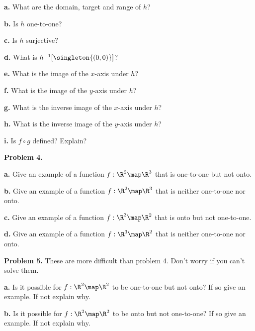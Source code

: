 \documentclass[oneside,12pt]{amsart}
\begin{document}
\smallskip

\textbf{a.}  What are the domain, target and range of $h$?

\medskip

\textbf{b.} Is $h$ one-to-one?

\medskip

\textbf{c.} Is $h$ surjective?

\medskip

\textbf{d.} What is $h^{-1}[\singleton{(0,0)}]$?

\medskip

\textbf{e.} What is the image of the $x$-axis under $h$?

\medskip

\textbf{f.} What is the image of the $y$-axis under $h$?

\medskip

\textbf{g.} What is the inverse image of the $x$-axis under $h$?

\medskip

\textbf{h.} What is the inverse image of the $y$-axis under $h$?

\medskip

\textbf{i.} Is $f \circ g$ defined? Explain?

\bigskip

\textbf{Problem 4.}
\smallskip

\textbf{a.} Give an example of a function $f:\R^2\map\R^3$ that is
one-to-one but not onto.

\bigskip

\textbf{b.} Give an example of a function $f:\R^2\map\R^3$ that is neither
one-to-one nor onto.

\bigskip

\textbf{c.} Give an example of a function $f:\R^3\map\R^2$ that is
onto but not one-to-one.

\bigskip

\textbf{d.} Give an example of a function $f:\R^3\map\R^2$ that is neither
one-to-one nor onto.


\bigskip

\textbf{Problem 5.} These are more difficult than problem 4. Don't worry
if you can't solve them.
\smallskip

\textbf{a.} Is it possible for $f:\R^2\map\R^2$ to be one-to-one but not onto?
If so give an example. If not explain why.

\bigskip

\textbf{b.} Is it possible for $f:\R^2\map\R^2$ to be onto but not one-to-one?
If so give an example. If not explain why.
\end{document}
